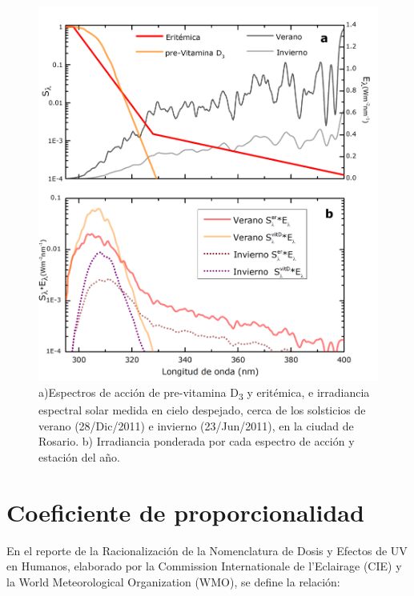 \documentclass[10pt,twocolumn]{article}
\begin{document}
\begin{figure}[ht]
  \centering
  \includegraphics[scale=0.4]{factores.jpg}
  \caption{a)Espectros de acción de pre-vitamina D\textsubscript{3} y eritémica, e irradiancia espectral solar medida en cielo despejado, cerca de los solsticios de verano (28/Dic/2011) e invierno (23/Jun/2011), en la ciudad de Rosario. b) Irradiancia ponderada por cada espectro de acción y estación del año.}
  \label{fig:factores}
\end{figure}

\section{Coeficiente de proporcionalidad}
En el reporte de la Racionalización de la Nomenclatura de Dosis y Efectos de UV en Humanos\cite{UVDoses}, elaborado por la Commission Internationale de l’Eclairage (CIE) y la World Meteorological Organization (WMO), se define la relación:
\end{document}
